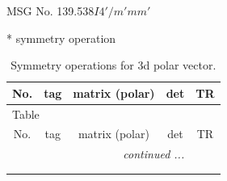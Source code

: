 \documentclass[fleqn,8pt]{jsarticle}
\begin{document}
\setcounter{MaxMatrixCols}{32}

\renewcommand{\tablename}{Table~}
\renewcommand{\figurename}{Figure~}
\begin{center}
\LARGE
MSG No. 139.538\quad$I4'/m'mm'$
\end{center}
* symmetry operation
\renewcommand{\arraystretch}{1.3}
\begin{longtable}{ccccc}
\caption{Symmetry operations for 3d polar vector.}
 \\
 \hline \hline
No. & tag & matrix (polar) & det & TR \\ \hline \endfirsthead

\multicolumn{4}{l}{\tablename\ \thetable{}} \\
 \hline \hline
No. & tag & matrix (polar) & det & TR \\ \hline \endhead

 \hline \hline
\multicolumn{4}{r}{\footnotesize\it continued ...} \\ \endfoot

 \hline \hline
\multicolumn{4}{r}{} \\ \endlastfoot


\end{longtable}
\end{document}
